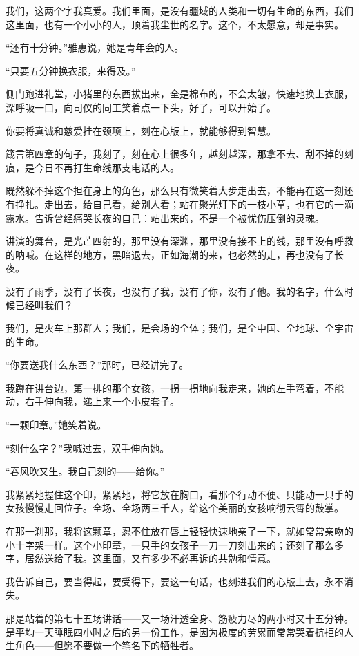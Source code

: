 \par 我们，这两个字我真爱。我们里面，是没有疆域的人类和一切有生命的东西，我们这里面，也有一个小小的人，顶着我尘世的名字。这个，不太愿意，却是事实。
\par “还有十分钟。”雅惠说，她是青年会的人。
\par “只要五分钟换衣服，来得及。”
\par 侧门跑进礼堂，小猪里的东西拔出来，全是棉布的，不会太皱，快速地换上衣服，深呼吸一口，向司仪的同工笑着点一下头，好了，可以开始了。
\par 你要将真诚和慈爱挂在颈项上，刻在心版上，就能够得到智慧。
\par 箴言第四章的句子，我刻了，刻在心上很多年，越刻越深，那拿不去、刮不掉的刻痕，是今日不再打生命线那支电话的人。
\par 既然躲不掉这个担在身上的角色，那么只有微笑着大步走出去，不能再在这一刻还有挣扎。走出去，给自己看，给别人看；站在聚光灯下的一枝小草，也有它的一滴露水。告诉曾经痛哭长夜的自己：站出来的，不是一个被忧伤压倒的灵魂。
\par 讲演的舞台，是光芒四射的，那里没有深渊，那里没有接不上的线，那里没有呼救的呐喊。在这样的地方，黑暗退去，正如海潮的来，也必然的走，再也没有了长夜。
\par 没有了雨季，没有了长夜，也没有了我，没有了你，没有了他。我的名字，什么时候已经叫我们？
\par 我们，是火车上那群人；我们，是会场的全体；我们，是全中国、全地球、全宇宙的生命。
\par “你要送我什么东西？”那时，已经讲完了。
\par 我蹲在讲台边，第一排的那个女孩，一拐一拐地向我走来，她的左手弯着，不能动，右手伸向我，递上来一个小皮套子。
\par “一颗印章。”她笑着说。
\par “刻什么字？”我喊过去，双手伸向她。
\par “春风吹又生。我自己刻的——给你。”
\par 我紧紧地握住这个印，紧紧地，将它放在胸口，看那个行动不便、只能动一只手的女孩慢慢走回位子。全场、全场两三千人，给这个美丽的女孩响彻云霄的鼓掌。
\par 在那一刹那，我将这颗章，忍不住放在唇上轻轻快速地亲了一下，就如常常亲吻的小十字架一样。这个小印章，一只手的女孩子一刀一刀刻出来的；还刻了那么多字，居然送给了我。这里面，又有多少不必再诉的共勉和情意。
\par 我告诉自己，要当得起，要受得下，要这一句话，也刻进我们的心版上去，永不消失。
\par 那是站着的第七十五场讲话——又一场汗透全身、筋疲力尽的两小时又十五分钟。是平均一天睡眠四小时之后的另一份工作，是因为极度的劳累而常常哭着抗拒的人生角色——但愿不要做一个笔名下的牺牲者。
